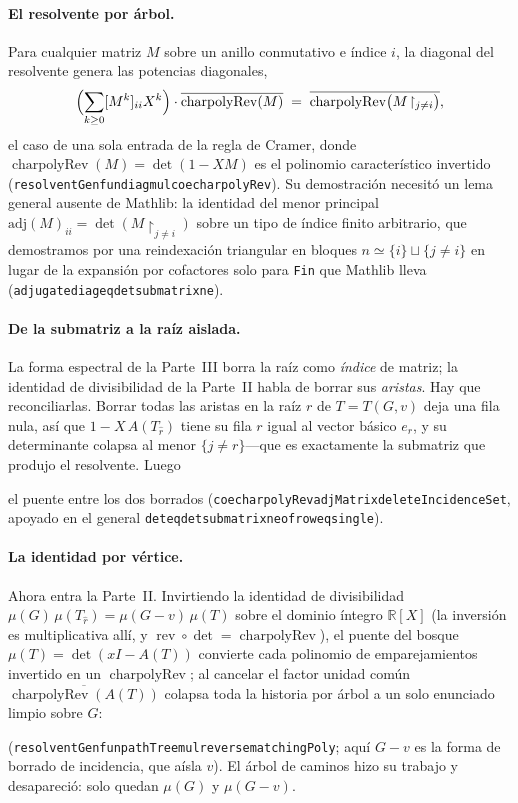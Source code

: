 \documentclass[11pt]{article}
\newcommand{\lean}[1]{{\def\_{\textunderscore\allowbreak}\texttt{#1}}}
\newcommand{\R}{\mathbb{R}}
\DeclareMathOperator{\rev}{rev}
\DeclareMathOperator{\charpolyRev}{charpolyRev}
\newcommand{\keyeq}[1]{\begin{center}\keybox{$\displaystyle #1$}\end{center}}
\begin{document}
\paragraph{El resolvente por \'arbol.} Para cualquier matriz $M$ sobre un anillo conmutativo e
\'indice $i$, la diagonal del resolvente genera las potencias diagonales,
\[
  \Bigl(\sum_{k\ge0}[M^k]_{ii}X^k\Bigr)\cdot\overline{\charpolyRev(M)}
  \;=\;\overline{\charpolyRev\bigl(M\!\restriction_{j\neq i}\bigr)},
\]
el caso de una sola entrada de la regla de Cramer, donde $\charpolyRev(M)=\det(1-XM)$ es el polinomio
caracter\'istico invertido (\lean{resolventGenfun\_diag\_mul\_coe\_charpolyRev}). Su demostraci\'on
necesit\'o un lema general ausente de Mathlib: la identidad del menor principal
$\mathrm{adj}(M)_{ii}=\det(M\!\restriction_{j\neq i})$ sobre un tipo de \'indice finito arbitrario, que
demostramos por una reindexaci\'on triangular en bloques $n\simeq\{i\}\sqcup\{j\neq i\}$ en lugar de la
expansi\'on por cofactores solo para \lean{Fin} que Mathlib lleva
(\lean{adjugate\_diag\_eq\_det\_submatrix\_ne}).

\paragraph{De la submatriz a la ra\'iz aislada.} La forma espectral de la Parte~III borra la ra\'iz
como \emph{\'indice} de matriz; la identidad de divisibilidad de la Parte~II habla de borrar sus
\emph{aristas}. Hay que reconciliarlas. Borrar todas las aristas en la ra\'iz $r$ de $T=T(G,v)$ deja
una fila nula, as\'i que $1-X\,A(T_{\widehat r})$ tiene su fila $r$ igual al vector b\'asico $e_r$, y
su determinante colapsa al menor $\{j\neq r\}$---que es exactamente la submatriz que produjo el
resolvente. Luego
\keyeq{\overline{\charpolyRev\bigl(A(T_{\widehat r})\bigr)}\;=\;\overline{\charpolyRev\bigl(A(T)\!\restriction_{j\neq
r}\bigr)},}
el puente entre los dos borrados (\lean{coe\_charpolyRev\_adjMatrix\_deleteIncidenceSet}, apoyado en el
general \lean{det\_eq\_det\_submatrix\_ne\_of\_row\_eq\_single}).

\paragraph{La identidad por v\'ertice.} Ahora entra la Parte~II. Invirtiendo la identidad de
divisibilidad $\mu(G)\,\mu(T_{\widehat r})=\mu(G-v)\,\mu(T)$ sobre el dominio \'integro $\R[X]$ (la
inversi\'on es multiplicativa all\'i, y $\rev\circ\det=\charpolyRev$), el puente del bosque
$\mu(T)=\det(xI-A(T))$ convierte cada polinomio de emparejamientos invertido en un $\charpolyRev$; al cancelar
el factor unidad com\'un $\overline{\charpolyRev(A(T))}$ colapsa toda la historia por \'arbol a un solo
enunciado limpio sobre $G$:
\keyeq{\Bigl(\sum_k[A(T(G,v))^k]_{\mathrm{ra\acute{\imath}z}}X^k\Bigr)\cdot\overline{\mu(G)}\;=\;\overline{\mu(G-v)} }
(\lean{resolventGenfun\_pathTree\_mul\_reverse\_matchingPoly}; aqu\'i $G-v$ es la forma de borrado de
incidencia, que a\'isla $v$). El \'arbol de caminos hizo su trabajo y desapareci\'o: solo quedan
$\mu(G)$ y $\mu(G-v)$.
\end{document}

